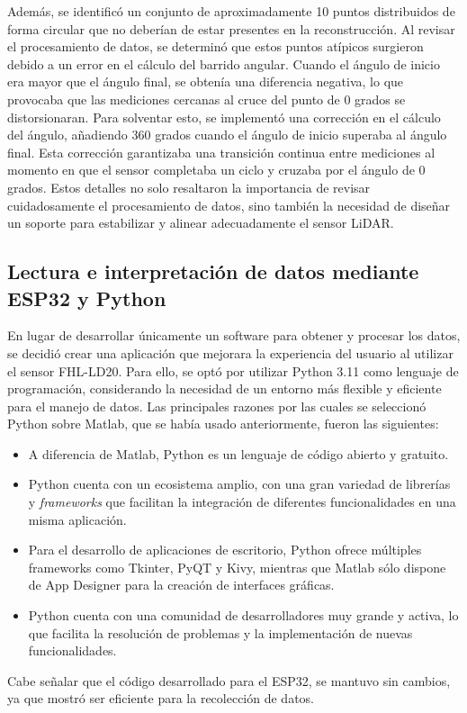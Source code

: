 Además, se identificó un conjunto de aproximadamente 10 puntos distribuidos de forma circular que no deberían de estar presentes en la reconstrucción. Al revisar el procesamiento de datos, se determinó que estos puntos atípicos surgieron debido a un error en el cálculo del barrido angular. Cuando el ángulo de inicio era mayor que el ángulo final, se obtenía una diferencia negativa, lo que provocaba que las mediciones cercanas al cruce del punto de 0 grados se distorsionaran. Para solventar esto, se implementó una corrección en el cálculo del ángulo, añadiendo 360 grados cuando el ángulo de inicio superaba al ángulo final. Esta corrección garantizaba una transición continua entre mediciones al momento en que el sensor completaba un ciclo y cruzaba por el ángulo de 0 grados. Estos detalles no solo resaltaron la importancia de revisar cuidadosamente el procesamiento de datos, sino también la necesidad de diseñar un soporte para estabilizar y alinear adecuadamente el sensor LiDAR.

\subsection{Lectura e interpretación de datos mediante ESP32 y Python}
En lugar de desarrollar únicamente un software para obtener y procesar los datos, se decidió crear una aplicación que mejorara la experiencia del usuario al utilizar el sensor FHL-LD20. Para ello, se optó por utilizar Python 3.11 como lenguaje de programación, considerando la necesidad de un entorno más flexible y eficiente para el manejo de datos. Las principales razones por las cuales se seleccionó Python sobre Matlab, que se había usado anteriormente, fueron las siguientes:
\begin{itemize}
	\item  A diferencia de Matlab, Python es un lenguaje de código abierto y gratuito. 
	\item Python cuenta con un ecosistema amplio, con una gran variedad de librerías y \textit{frameworks} que facilitan la integración de diferentes funcionalidades en una misma aplicación.
	\item Para el desarrollo de aplicaciones de escritorio, Python ofrece múltiples frameworks como Tkinter, PyQT y Kivy, mientras que Matlab sólo dispone de App Designer para la creación de interfaces gráficas.
	\item Python cuenta con una comunidad de desarrolladores muy grande y activa, lo que facilita la resolución de problemas y la implementación de nuevas funcionalidades.
\end{itemize}
Cabe señalar que el código desarrollado para el ESP32, se mantuvo sin cambios, ya que mostró ser eficiente para la recolección de datos.

